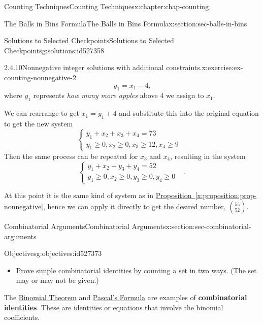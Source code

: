 \documentclass[oneside,10pt,]{book}
\newcommand{\xreffont}{\relax}
\newcommand{\terminology}[1]{\textbf{#1}}
\numberwithin{equation}{section}
\newcommand{\amp}{&}
\begin{document}
\begin{chapterptx}{Counting Techniques}{}{Counting Techniques}{}{}{x:chapter:chap-counting}
\begin{sectionptx}{The Balls in Bins Formula}{}{The Balls in Bins Formula}{}{}{x:section:sec-balls-in-bins}
\begin{solutions-subsection-numberless}{Solutions to Selected Checkpoints}{}{Solutions to Selected Checkpoints}{}{}{g:solutions:id527358}
\begin{inlinesolution}{2.4.10}{Nonnegative integer solutions with additional constraints.}{x:exercise:ex-counting-nonnegative-2}
\begin{equation*}
y_1 = x_1 - 4\text{,}
\end{equation*}
where \(y_1\) represents \emph{how many more apples} above 4 we assign to \(x_1\).%
\par
We can rearrange to get \(x_1 = y_1 + 4\) and substitute this into the original equation to get the new system%
\begin{equation*}
\begin{cases}
y_1 + x_2 + x_3 + x_4 = 73 \amp \\ y_1 \geq 0, x_2 \geq 0, x_3 \geq 12, x_4 \geq 9 \amp
\end{cases}
\end{equation*}
Then the same process can be repeated for \(x_3\) and \(x_4\), resulting in the system%
\begin{equation*}
\begin{cases}
y_1 + x_2 + y_3 + y_4 = 52 \amp \\ y_1 \geq 0, x_2 \geq 0, y_3 \geq 0, y_4 \geq 0 \amp
\end{cases}\text{.}
\end{equation*}
%
\par
At this point it is the same kind of system as in \hyperref[x:proposition:prop-nonnegative]{Proposition~{\xreffont\ref{x:proposition:prop-nonnegative}}}, hence we can apply it directly to get the desired number, \(\displaystyle\binom{55}{52}\).%
\end{inlinesolution}%
\end{solutions-subsection-numberless}
\end{sectionptx}
%
%
\typeout{************************************************}
\typeout{************************************************}
%
\begin{sectionptx}{Combinatorial Arguments}{}{Combinatorial Arguments}{}{}{x:section:sec-combinatorial-arguments}
\begin{objectives}{Objectives}{g:objectives:id527373}
%
\begin{itemize}[label=\textbullet]
\item{}Prove simple combinatorial identities by counting a set in two ways. (The set may or may not be given.)%
\end{itemize}
\end{objectives}
The \hyperref[x:theorem:thm-binomial]{Binomial Theorem} and \hyperref[x:theorem:thm-pascals-formula]{Pascal's Formula} are examples of \terminology{combinatorial identities}. These are identities or equations that involve the binomial coefficients.%

\end{sectionptx}
\end{chapterptx}
\end{document}
